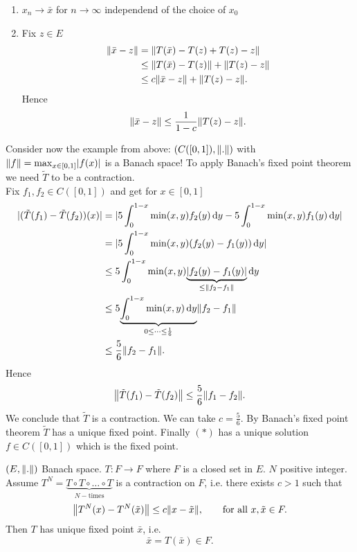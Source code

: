 \begin{bemerkung}
	\begin{enumerate}[(1)]
		\item $x_n \to \bar{x}$ for $n \to \infty$ independend of the choice of $x_0$
		\item Fix $z \in E$
		\begin{align*}
			\norm{\bar{x}-z} &= \norm{T(\bar{x})- T(z) + T(z) -z} \\
			&\leq \norm{T(\bar{x})-T(z)} + \norm{T(z) -z} \\
			&\leq c \norm{\bar{x}-z} + \norm{T(z) - z}.
		\end{align*}
		Hence 
		\[
			\norm{\bar{x}-z} \leq \frac{1}{1-c}\norm{T(z)-z}.
		\]
	\end{enumerate}
\end{bemerkung}
\begin{beispiel}
	Consider now the example from above: $(C([0,1]), \norm{.})$ with $\norm{f} = \max_{x \in [0,1]}\abs{f(x)}$ is a Banach space! To apply Banach's fixed point theorem we need $\tilde T$ to be a contraction. \\
	Fix $f_1,f_2 \in C([0,1])$ and get for $x \in [0,1]$
	\begin{align*}
		\abs{(\tilde T(f_1)- \tilde T(f_2))(x)} & = \abs{5 \int_{0}^{1-x} \min(x,y)f_2(y) \,\mathrm{d}y - 5 \int_{0}^{1-x}\min(x,y)f_1(y) \,\mathrm{d}y} \\
		&= \abs{5 \int_{0}^{1-x} \min(x,y)(f_2(y)-f_1(y)) \,\mathrm{d}y} \\
		&\leq 5 \int_{0}^{1-x} \min(x,y) \underset{\leq \norm{f_2-f_1}}{\underbrace{\abs{f_2(y)-f_1(y)}}} \,\mathrm{d}y \\
		&\leq 5 \underset{0 \leq  \dots \leq \frac{1}{6}}{\underbrace{\int_{0}^{1-x} \min(x,y)\,\mathrm{d}y}} \norm{f_2-f_1} \\
		&\leq \frac{5}{6} \norm{f_2-f_1}.
	\end{align*}
	Hence \[
		\norm{\tilde T(f_1)- \tilde T(f_2)} \leq \frac{5}{6} \norm{f_1-f_2}.
	\]
	We conclude that $\tilde T$ is a contraction. We can take $c = \frac{5}{6}$. By Banach's fixed point theorem $\tilde T$ has a unique fixed point. Finally $(*)$
	has a unique solution $f \in C([0,1])$ which is the fixed point. 
\end{beispiel}
\begin{theorem}
	$(E, \norm{.})$ Banach space. $T: F \to F$ where $F$ is a closed set in $E$. $N$ positive integer. Assume $T^N = \underset{N-\text{times}}{\underbrace{T \circ T \circ \dots \circ T}}$ is a contraction on $F$, i.e. there exists $c > 1$ such that
	\[
		\norm{T^N(x)- T^N(\tilde x)} \leq c \norm{x-\tilde x}, \qquad \text{for all }x, \tilde x \in F.
	\]
	Then $T$ has unique fixed point $\bar{ x}$, i.e.
	\[
		\bar{x} = T(\bar{x}) \in F.
	\]
\end{theorem}
